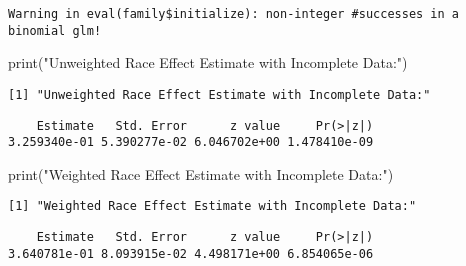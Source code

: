 \documentclass[
  letterpaper,
  DIV=11,
  numbers=noendperiod]{scrartcl}
\newenvironment{Shaded}{\begin{snugshade}}{\end{snugshade}}
\newcommand{\FunctionTok}[1]{\textcolor[rgb]{0.28,0.35,0.67}{#1}}
\newcommand{\NormalTok}[1]{\textcolor[rgb]{0.00,0.23,0.31}{#1}}
\newcommand{\SpecialCharTok}[1]{\textcolor[rgb]{0.37,0.37,0.37}{#1}}
\newcommand{\StringTok}[1]{\textcolor[rgb]{0.13,0.47,0.30}{#1}}
\begin{document}
\begin{verbatim}
Warning in eval(family$initialize): non-integer #successes in a binomial glm!
\end{verbatim}

\begin{Shaded}
\begin{Highlighting}[]
\FunctionTok{print}\NormalTok{(}\StringTok{"Unweighted Race Effect Estimate with Incomplete Data:"}\NormalTok{)}
\end{Highlighting}
\end{Shaded}

\begin{verbatim}
[1] "Unweighted Race Effect Estimate with Incomplete Data:"
\end{verbatim}

\begin{Shaded}
\end{Shaded}

\begin{verbatim}
    Estimate   Std. Error      z value     Pr(>|z|) 
3.259340e-01 5.390277e-02 6.046702e+00 1.478410e-09 
\end{verbatim}

\begin{Shaded}
\begin{Highlighting}[]
\FunctionTok{print}\NormalTok{(}\StringTok{"Weighted Race Effect Estimate with Incomplete Data:"}\NormalTok{)}
\end{Highlighting}
\end{Shaded}

\begin{verbatim}
[1] "Weighted Race Effect Estimate with Incomplete Data:"
\end{verbatim}

\begin{Shaded}
\end{Shaded}

\begin{verbatim}
    Estimate   Std. Error      z value     Pr(>|z|) 
3.640781e-01 8.093915e-02 4.498171e+00 6.854065e-06 
\end{verbatim}
\end{document}
